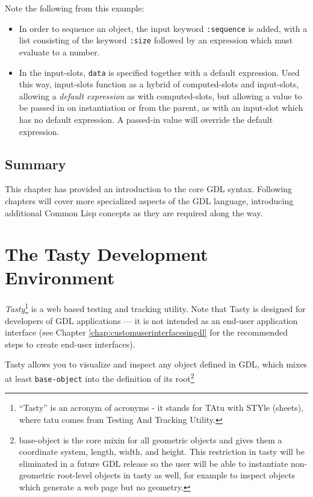 \documentclass [11pt]{book}
\begin{document}
Note the following from this example:

\begin{itemize}

\item In order to sequence an object, the input keyword \texttt{:sequence} is added, with a list consisting of the keyword \texttt{:size} followed by an expression which must evaluate to a number.

\item In the input-slots, \texttt{data} is specified together with a default expression. Used this way, 
input-slots function as a hybrid of computed-slots and input-slots, allowing a \emph{default expression} as with computed-slots, but allowing a value to be passed in on 
instantiation or from the parent, as with an input-slot which has no default expression. 
A passed-in value will override the default expression.

\end{itemize}



\section{Summary}

\label{sec:summary}

This chapter has provided an introduction to the core GDL
syntax. Following chapters will cover more specialized aspects
of the GDL language, introducing additional Common Lisp concepts as they are
required along the way.

\chapter{The Tasty Development Environment}

\label{chap:thetastydevelopmentenvironment}



\emph{Tasty}\footnote{``Tasty'' is an acronym of acronyms - it stands
for TAtu with STYle (sheets), where tatu comes from Testing And
Tracking Utility.} is a web based testing and tracking utility. Note that Tasty is
designed for developers of GDL applications --- it is not intended
as an end-user application interface (see Chapter 
\ref{chap:customuserinterfacesingdl} for the recommended steps to create end-user interfaces).



Tasty allows you to visualize and inspect any object defined
in GDL, which mixes at least \texttt{base-object} into the definition of its root\footnote{base-object is the core mixin for all geometric
objects and gives them a coordinate system, length, width, and
height. This restriction in tasty will be eliminated in a future GDL
release so the user will be able to instantiate non-geometric
root-level objects in tasty as well, for example to inspect objects
which generate a web page but no geometry.}
\end{document}
